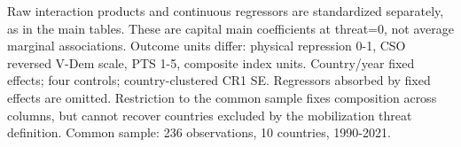 \begin{table}[htbp]\centering
\caption{H2. Capital coefficients with a fixed common sample}
\label{tab:measurement_h2}
\small
{}
\begin{tablenotes}\footnotesize Raw interaction products and continuous regressors are standardized separately, as in the main tables. These are capital main coefficients at threat=0, not average marginal associations. Outcome units differ: physical repression 0-1, CSO reversed V-Dem scale, PTS 1-5, composite index units. Country/year fixed effects; four controls; country-clustered CR1 SE. Regressors absorbed by fixed effects are omitted. Restriction to the common sample fixes composition across columns, but cannot recover countries excluded by the mobilization threat definition. Common sample: 236 observations, 10 countries, 1990-2021.\end{tablenotes}
\end{table}